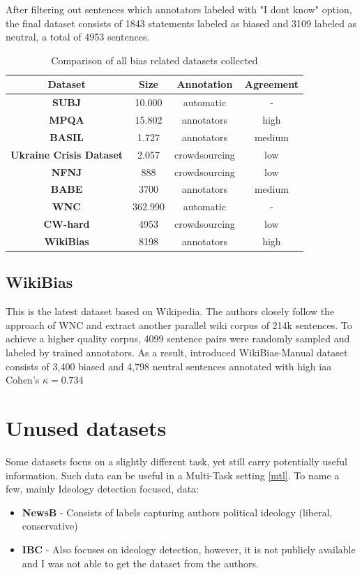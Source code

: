 After filtering out sentences which annotators labeled with "I dont know" option, the final dataset consists of 1843 statements labeled as biased and 3109 labeled as neutral, a total of 4953 sentences.

\begin{table}
\begin{ctucolortab}
\begin{tabular}{c|c|c|c}
 \textbf{Dataset} & \textbf{Size} & \textbf{Annotation} & \textbf{Agreement}\\
 \hline
 \textbf{SUBJ} & 10.000 & automatic & -\\ 
 \hline
 \textbf{MPQA} & 15.802 & annotators & high \\
 \hline
 \textbf{BASIL} &  1.727 & annotators & medium \\ 
 \hline
 \textbf{Ukraine Crisis Dataset} & 2.057 & crowdsourcing & low \\ 
 \hline
 \textbf{NFNJ} & 888 & crowdsourcing & low \\
 \hline
 \textbf{BABE} & 3700 & annotators & medium \\
 \hline 
 \textbf{WNC} & 362.990 & automatic & - \\
 \hline
 \textbf{CW-hard} & 4953 & crowdsourcing & low \\
 \hline 
 \textbf{WikiBias} & 8198 & annotators & high \\
 \hline
\end{tabular}
\end{ctucolortab}
\caption{Comparison of all bias related datasets collected}
\label{table:1}
\end{table}


\subsection{WikiBias}
This is the latest dataset based on Wikipedia. The authors closely follow the approach of WNC \cite{pryzant2020automatically} and extract another parallel wiki corpus of 214k sentences.
To achieve a higher quality corpus, 4099 sentence pairs were randomly sampled and labeled by trained annotators. As a result, introduced WikiBias-Manual dataset consists of 3,400 biased and 4,798 neutral sentences annotated with high \gls{iaa} Cohen's $\kappa = 0.734$




\section{Unused datasets}
 Some datasets focus on a slightly different task, yet still carry potentially useful information. Such data can be useful in a Multi-Task setting \ref{mtl}. To name a few, mainly Ideology detection focused, data:
\begin{itemize}
\item \textbf{NewsB} - 
Consists of labels capturing authors political ideology (liberal, conservative)
\item \textbf{IBC} - Also focuses on ideology detection, however, it is not publicly available and I was not able to get the dataset from the authors.
\end{itemize}


